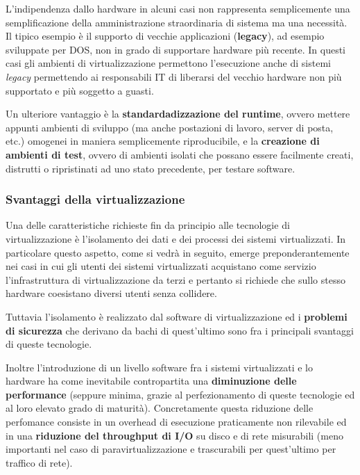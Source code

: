 \documentclass[italian,]{article}
\begin{document}
L'indipendenza dallo hardware in alcuni casi non rappresenta
semplicemente una semplificazione della amministrazione straordinaria di
sistema ma una necessità. Il tipico esempio è il supporto di vecchie
applicazioni (\textbf{legacy}), ad esempio sviluppate per DOS, non in
grado di supportare hardware più recente. In questi casi gli ambienti di
virtualizzazione permettono l'esecuzione anche di sistemi \emph{legacy}
permettendo ai responsabili IT di liberarsi del vecchio hardware non più
supportato e più soggetto a guasti.

Un ulteriore vantaggio è la \textbf{standardadizzazione del runtime},
ovvero mettere appunti ambienti di sviluppo (ma anche postazioni di
lavoro, server di posta, etc.) omogenei in maniera semplicemente
riproducibile, e la \textbf{creazione di ambienti di test}, ovvero di
ambienti isolati che possano essere facilmente creati, distrutti o
ripristinati ad uno stato precedente, per testare software.

\subsubsection{Svantaggi della
virtualizzazione}\label{svantaggi-della-virtualizzazione}

Una delle caratteristiche richieste fin da principio alle tecnologie di
virtualizzazione è l'isolamento dei dati e dei processi dei sistemi
virtualizzati. In particolare questo aspetto, come si vedrà in seguito,
emerge preponderantemente nei casi in cui gli utenti dei sistemi
virtualizzati acquistano come servizio l'infrastruttura di
virtualizzazione da terzi e pertanto si richiede che sullo stesso
hardware coesistano diversi utenti senza collidere.

Tuttavia l'isolamento è realizzato dal software di virtualizzazione ed i
\textbf{problemi di sicurezza} che derivano da bachi di quest'ultimo
sono fra i principali svantaggi di queste tecnologie.

Inoltre l'introduzione di un livello software fra i sistemi
virtualizzati e lo hardware ha come inevitabile contropartita una
\textbf{diminuzione delle performance} (seppure minima, grazie al
perfezionamento di queste tecnologie ed al loro elevato grado di
maturità). Concretamente questa riduzione delle perfomance consiste in
un overhead di esecuzione praticamente non rilevabile ed in una
\textbf{riduzione del throughput di I/O} su disco e di rete misurabili
(meno importanti nel caso di paravirtualizzazione e trascurabili per
quest'ultimo per traffico di rete).
\end{document}
